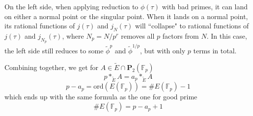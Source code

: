 \documentclass[]{article}
\begin{document}
On the left side, when applying reduction to $\phi(\tau)$ with bad primes, it can land on either a normal point or the singular point. When it lands on a normal point, its rational functions of $j(\tau)$ and $j_N(\tau)$ will ``collapse" to rational functions of $j(\tau)$ and $j_{N_p}(\tau)$, where $N_p = N / p^r$ removes all $p$ factors from $N$. In this case, the left side still reduces to some $\tilde{\phi}^p$ and $\tilde{\phi}^{1/p}$, but with only $p$ terms in total.

Combining together, we get for $A \in \tilde{E}\cap \mathbf{P}_2(\mathbb{F}_p)$
\[
p *_{\tilde{E}} A = a_p *_{\tilde{E}} A
\]
\[
p - a_p = \mathrm{ord}(E(\mathbb{F}_p)) = \# E(\mathbb{F}_p) - 1
\]
which ends up with the same formula as the one for good prime
\[
\# E(\mathbb{F}_p) = p - a_p + 1
\]
\end{document}

